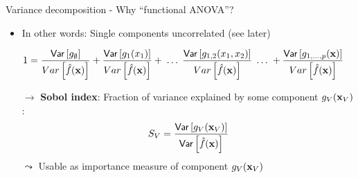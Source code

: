 \documentclass[10pt,compress,t,notes=noshow, xcolor=table]{beamer}
\newcommand{\open}{}
\newcommand{\close}{}
\newcommand{\predvar}{Var\left[\hat{f}(\xv)\right]}
\begin{document}
\begin{frame}{Variance decomposition - Why ``functional ANOVA''?
}
\begin{itemize}[<+->]
\item In other words: Single components uncorrelated (see later)


\begin{align*}
1 &= \frac{\var\left[g_{\open \emptyset \close}\right]}{\predvar} + \frac{\var\left[g_{\open 1 \close}(x_1)\right]}{\predvar} + %
\;\dots\;
\frac{\var\left[g_{\open 1, 2 \close}(x_1, x_2)\right]}{\predvar} \;\dots\; + \frac{\var\left[g_{\open 1,\ldots,p \close}(\xv)\right]}{\predvar}
\end{align*}

\item[$\rightarrow$] \textbf{Sobol index}: Fraction of variance explained by some component $g_{\open V \close}(\xv_V)$:
$$
S_V = \frac{\var\left[g_{\open V \close}(\xv_V)\right]}{\var\left[\hat{f}(\xv)\right]}
$$
$\leadsto$ Usable as importance measure of component $g_{\open V \close}(\xv_V)$\\
\end{itemize}

\end{frame}



\endlecture
\end{document}
